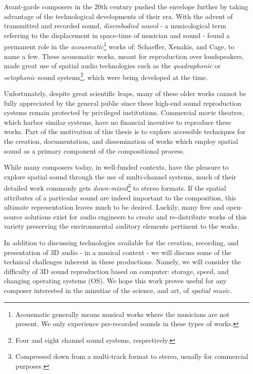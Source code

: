 Avant-garde composers in the 20th century pushed the envelope further by taking advantage of the technological developments of their era. With the advent of transmitted and recorded sound, \textit{disembodied sound} - a musicological term referring to the displacement in space-time of musician and sound - found a permanent role in the \textit{acousmatic}\footnote{Acousmatic generally means musical works where the musicians are not present. We only experience pre-recorded sounds in these types of works.} works of: Schaeffer, Xenakis, and Cage, to name a few. These acousmatic works, meant for reproduction over loudspeakers, made great use of spatial audio technologies such as the \textit{quadraphonic} or \textit{octophonic} sound systems\footnote{Four and eight channel sound systems, respectively.}, which were being developed at the time. 

Unfortunately, despite great scientific leaps, many of these older works cannot be fully appreciated by the general public since these high-end sound reproduction systems remain protected by privileged institutions. Commercial movie theatres, which harbor similar systems, have no financial incentive to reproduce these works. Part of the motivation of this thesis is to explore accessible techniques for the creation, documentation, and dissemination of works which employ spatial sound as a primary component of the compositional process. 

While many composers today, in well-funded contexts, have the pleasure to explore spatial sound through the use of multi-channel systems, much of their detailed work commonly gets \textit{down-mixed}\footnote{Compressed down from a multi-track format to stereo, usually for commercial purposes.} to stereo formats. If the spatial attributes of a particular sound are indeed important to the composition, this ultimate representation leaves much to be desired. Luckily, many free and open-source solutions exist for audio engineers to create and re-distribute works of this variety preserving the environmental auditory elements pertinent to the works.

In addition to discussing technologies available for the creation, recording, and presentation of 3D audio - in a musical context - we will discuss some of the technical challenges inherent in these productions. Namely, we will consider the difficulty of 3D sound reproduction based on computer: storage, speed, and changing operating systems (OS). We hope this work proves useful for any composer interested in the minutiae of the science, and art, of \textit{spatial music}.

